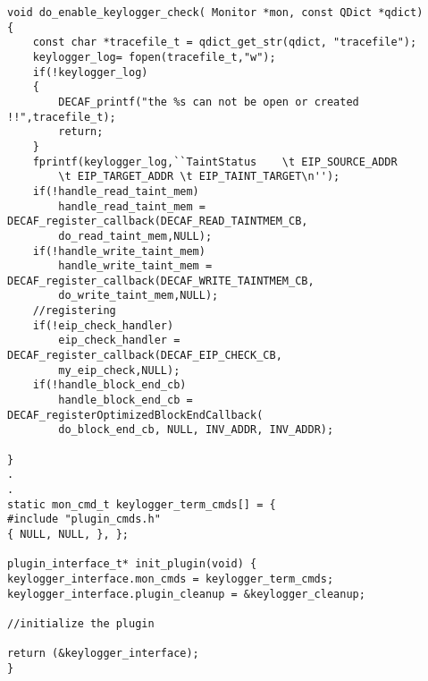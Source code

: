 \documentclass[a4paper, 11pt]{article}
\begin{document}
\begin{lstlisting}
void do_enable_keylogger_check( Monitor *mon, const QDict *qdict)
{
    const char *tracefile_t = qdict_get_str(qdict, "tracefile");
    keylogger_log= fopen(tracefile_t,"w");
    if(!keylogger_log)
    {
        DECAF_printf("the %s can not be open or created !!",tracefile_t);
        return;
    }
    fprintf(keylogger_log,``TaintStatus    \t EIP_SOURCE_ADDR   
	    \t EIP_TARGET_ADDR \t EIP_TAINT_TARGET\n'');
    if(!handle_read_taint_mem)
        handle_read_taint_mem = DECAF_register_callback(DECAF_READ_TAINTMEM_CB,
        do_read_taint_mem,NULL);
    if(!handle_write_taint_mem)
        handle_write_taint_mem = DECAF_register_callback(DECAF_WRITE_TAINTMEM_CB,
        do_write_taint_mem,NULL);
    //registering
    if(!eip_check_handler)
        eip_check_handler = DECAF_register_callback(DECAF_EIP_CHECK_CB,
        my_eip_check,NULL);
    if(!handle_block_end_cb)
        handle_block_end_cb =  DECAF_registerOptimizedBlockEndCallback(
        do_block_end_cb, NULL, INV_ADDR, INV_ADDR);

}
.
.
static mon_cmd_t keylogger_term_cmds[] = {
#include "plugin_cmds.h"
{ NULL, NULL, }, };

plugin_interface_t* init_plugin(void) {
keylogger_interface.mon_cmds = keylogger_term_cmds;
keylogger_interface.plugin_cleanup = &keylogger_cleanup;

//initialize the plugin

return (&keylogger_interface);
}
\end{lstlisting}
\end{document}
